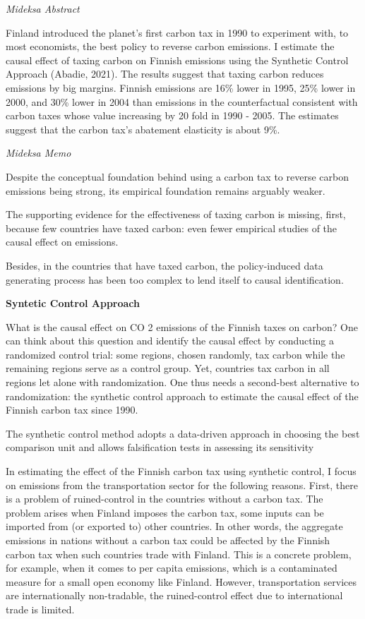 \documentclass[
]{book}
\begin{document}
\emph{Mideksa Abstract}

Finland introduced the planet's first carbon tax in 1990 to experiment with, to most economists,
the best policy to reverse carbon emissions. I estimate the causal effect of taxing carbon on Finnish
emissions using the Synthetic Control Approach (Abadie, 2021). The results suggest that taxing
carbon reduces emissions by big margins. Finnish emissions are 16\% lower in 1995, 25\% lower
in 2000, and 30\% lower in 2004 than emissions in the counterfactual consistent with carbon taxes
whose value increasing by 20 fold in 1990 - 2005. The estimates suggest that the carbon tax's
abatement elasticity is about 9\%.

\emph{Mideksa Memo}

Despite the conceptual
foundation behind using a carbon tax to reverse carbon emissions being strong, its
empirical foundation remains arguably weaker.

The supporting evidence for the effectiveness of taxing carbon is missing, first,
because few countries have taxed carbon: even fewer empirical studies of the causal
effect on emissions.

Besides, in the countries that have
taxed carbon, the policy-induced data generating process has been too complex to lend
itself to causal identification.

\textbf{Syntetic Control Approach}

What is the causal effect on CO 2 emissions of the Finnish taxes on carbon? One can
think about this question and identify the causal effect by conducting a randomized control
trial: some regions, chosen randomly, tax carbon while the remaining regions serve as a
control group. Yet, countries tax carbon in all regions let alone with randomization. One
thus needs a second-best alternative to randomization: the synthetic control approach to
estimate the causal effect of the Finnish carbon tax since 1990.

The synthetic control method adopts a data-driven approach in choosing the best
comparison unit and allows falsification tests in assessing its sensitivity

In estimating the effect of the Finnish carbon tax using synthetic control, I focus
on emissions from the transportation sector for the following reasons. First, there is a
problem of ruined-control in the countries without a carbon tax. The problem arises
when Finland imposes the carbon tax, some inputs can be imported from (or exported
to) other countries. In other words, the aggregate emissions in nations without a carbon
tax could be affected by the Finnish carbon tax when such countries trade with Finland.
This is a concrete problem, for example, when it comes to per capita emissions, which is
a contaminated measure for a small open economy like Finland. However, transportation
services are internationally non-tradable, the ruined-control effect due to international
trade is limited.
\end{document}
